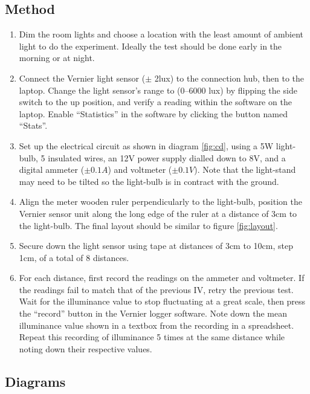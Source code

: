 \documentclass[a4paper,12pt]{article}
\begin{document}
\subsection{Method}

\begin{enumerate}
 \item Dim the room lights and choose a location with the least amount of ambient light to do the experiment. Ideally the test should be done early in the morning or at night.

 \item Connect the Vernier light sensor ($\pm$ 2\si{lux}) to the connection hub, then to the laptop. Change the light sensor's range to (0–6000 \si{lux}) by flipping the side switch to the up position, and verify a reading within the software on the laptop. Enable ``Statistics'' in the software by clicking the button named ``Stats''.

 \item Set up the electrical circuit as shown in diagram \ref{fig:cd}, using a 5W light-bulb, 5 insulated wires, an 12V power supply dialled down to 8V, and a digital ammeter ($\pm 0.1 \si{A}$) and voltmeter ($\pm 0.1 \si{V}$). Note that the light-stand may need to be tilted so the light-bulb is in contract with the ground.

 \item Align the meter wooden ruler perpendicularly to the light-bulb, position the Vernier sensor unit along the long edge of the ruler at a distance of 3cm to the light-bulb. The final layout should be similar to figure \ref{fig:layout}.

 \item Secure down the light sensor using tape at distances of 3cm to 10cm, step 1cm, of a total of 8 distances.

 \item For each distance, first record the readings on the ammeter and voltmeter. If the readings fail to match that of the previous IV, retry the previous test. Wait for the illuminance value to stop fluctuating at a great scale, then press the ``record'' button in the Vernier logger software. Note down the mean illuminance value shown in a textbox from the recording in a spreadsheet. Repeat this recording of illuminance 5 times at the same distance while noting down their respective values.
\end{enumerate}

\subsection{Diagrams}
\end{document}

